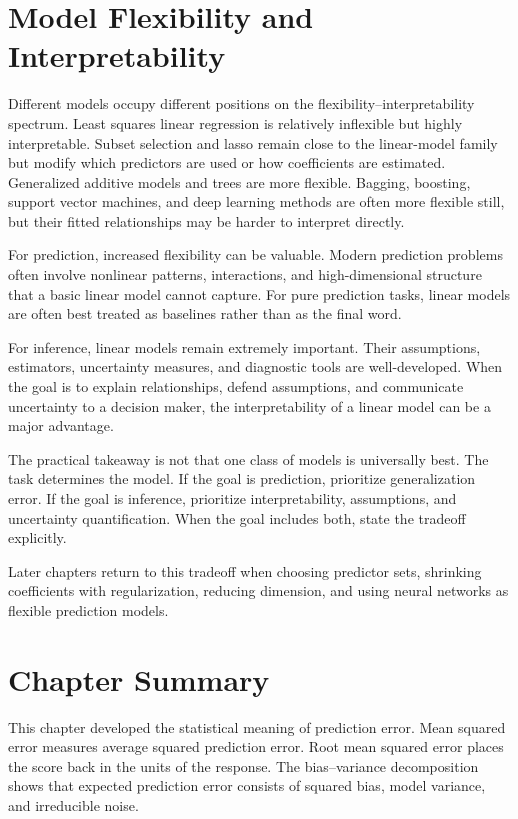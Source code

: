 {\section{Model Flexibility and Interpretability}

Different models occupy different positions on the flexibility--interpretability spectrum.  Least squares linear regression is relatively inflexible but highly interpretable.  Subset selection and lasso remain close to the linear-model family but modify which predictors are used or how coefficients are estimated.  Generalized additive models and trees are more flexible.  Bagging, boosting, support vector machines, and deep learning methods are often more flexible still, but their fitted relationships may be harder to interpret directly.

For prediction, increased flexibility can be valuable.  Modern prediction problems often involve nonlinear patterns, interactions, and high-dimensional structure that a basic linear model cannot capture.  For pure prediction tasks, linear models are often best treated as baselines rather than as the final word.

For inference, linear models remain extremely important.  Their assumptions, estimators, uncertainty measures, and diagnostic tools are well-developed.  When the goal is to explain relationships, defend assumptions, and communicate uncertainty to a decision maker, the interpretability of a linear model can be a major advantage.

The practical takeaway is not that one class of models is universally best.  The task determines the model.  If the goal is prediction, prioritize generalization error.  If the goal is inference, prioritize interpretability, assumptions, and uncertainty quantification.  When the goal includes both, state the tradeoff explicitly.

Later chapters return to this tradeoff when choosing predictor sets, shrinking coefficients with regularization, reducing dimension, and using neural networks as flexible prediction models.

\section{Chapter Summary}

This chapter developed the statistical meaning of prediction error.  Mean squared error measures average squared prediction error.  Root mean squared error places the score back in the units of the response.  The bias--variance decomposition shows that expected prediction error consists of squared bias, model variance, and irreducible noise.

}
